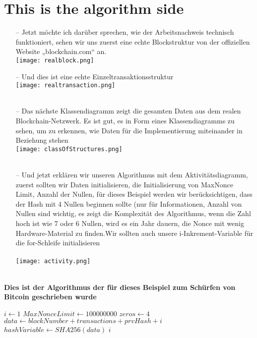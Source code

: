 \documentclass[ngerman]{scrreprt}
\begin{document}
\section{This is the algorithm side}
\begin{itemize}
	\item[--] Jetzt möchte ich darüber sprechen, wie der Arbeitsnachweis technisch funktioniert, sehen wir uns zuerst eine echte Blockstruktur von der offiziellen Website „blockchain.com“ an. \\
	\texttt{[image: realblock.png]} \\
	\item[--] Und dies ist eine echte Einzeltransaktionsstruktur \\
	\texttt{[image: realtransaction.png]} \\ \\
	\item[--] Das nächste Klassendiagramm zeigt die gesamten Daten aus dem realen Blockchain-Netzwerk. Es ist gut, es in Form eines Klassendiagramms zu sehen, um zu erkennen, wie Daten für die Implementierung miteinander in Beziehung stehen \\
	\texttt{[image: classOfStructures.png]} \\ \\
	\item[--] {Und jetzt erklären wir unseren Algorithmus mit dem Aktivitätsdiagramm, zuerst sollten wir Daten initialisieren, die Initialisierung von Max\textunderscore Nonce \textunderscore Limit, Anzahl der Nullen, für dieses Beispiel werden wir berücksichtigen, dass der Hash mit 4 Nullen beginnen sollte (nur für Informationen, Anzahl von Nullen sind wichtig, es zeigt die Komplexität des Algorithmus, wenn die Zahl hoch ist wie 7 oder 6 Nullen, wird es ein Jahr dauern, die Nonce mit wenig Hardware-Material zu finden.Wir sollten auch unsere i-Inkrement-Variable für die for-Schleife initialisieren } \\ \\
		\texttt{[image: activity.png]} \\ \\
		

	
\end{itemize}
\begin{LARGE}
	\textbf{Dies ist der Algorithmus \textcommabelow der für dieses Beispiel zum Schürfen von Bitcoin geschrieben wurde} \\
\end{LARGE}
\begin{algorithmic}
	\State $i \gets 1$
	\State $MaxNonceLimit \gets 100000000$
	\State $zeros \gets 4$
		\State $data \gets blockNumber + transactions + prvHash + i$
		\State $hashVariable \gets  SHA256(data)$
			\Return $i$
		\EndIf
	\EndFor
	
\end{algorithmic}
\end{document}
